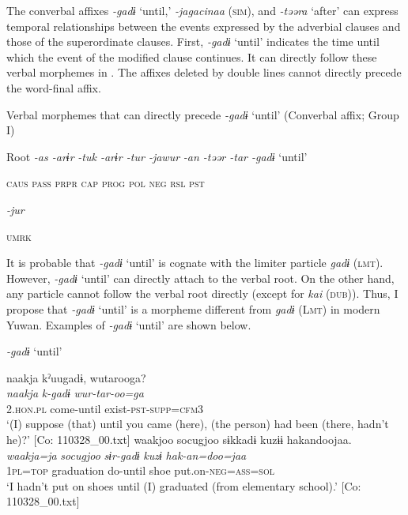 The converbal affixes \textit{-gadɨ} ‘until,’ \textit{-jagacinaa} (\textsc{sim}), and \textit{-təəra} ‘after’ can express temporal relationships between the events expressed by the adverbial clauses and those of the superordinate clauses. First, \textit{-gadɨ} ‘until’ indicates the time until which the event of the modified clause continues. It can directly follow these verbal morphemes in . The affixes deleted by double lines cannot directly precede the word-final affix.

\ea\label{ex:8-94}
  Verbal morphemes that can directly precede \textit{-gadɨ} ‘until’ (Converbal affix; Group I)

  Root  \textit{-as  -arɨr} %
\textit{-tuk  -arɨr  -tur  -jawur} %
\textit{-an  -təər  -tar  -gadɨ} ‘until’

    \textsc{caus}  \textsc{pass}  \textsc{prpr}  \textsc{cap}  \textsc{prog}  \textsc{pol}  \textsc{neg}  \textsc{rsl}  \textsc{pst}

          \textit{-jur}

          \textsc{umrk}
\z

It is probable that \textit{-gadɨ} ‘until’ is cognate with the limiter particle \textit{gadɨ} (\textsc{lmt}). However, \textit{-gadɨ} ‘until’ can directly attach to the verbal root. On the other hand, any particle cannot follow the verbal root directly (except for \textit{kai} (\textsc{dub})). Thus, I propose that \textit{-gadɨ} ‘until’ is a morpheme different from \textit{gadɨ} (L\textsc{mt}) in modern Yuwan. Examples of \textit{-gadɨ} ‘until’ are shown below.

\ea\label{ex:8-95}
  \textit{-gadɨ} ‘until’

\ea
{\TM}
\glll  naakja  kˀuugadɨ,  wutarooga?\\
\textit{naakja}  \textit{k-gadɨ}  \textit{wur-tar-oo=ga}\\
2.\textsc{hon}.\textsc{pl}  come-until  exist-\textsc{pst}-\textsc{supp}=\textsc{cfm3}\\
\glt ‘(I) suppose (that) until you came (here), (the person) had been (there, hadn’t he)?’ [Co: 110328\_00.txt]
\ex
{\TM}
\glll  waakjoo  {\textbar}socugjoo{\textbar}  sɨkkadɨ  kuzɨɨ  hakandoojaa.\\
\textit{waakja=ja}  \textit{socugjoo}  \textit{sɨr-gadɨ}  \textit{kuzɨ}  \textit{hak-an=doo=jaa}\\
1\textsc{pl}=\textsc{top}  graduation  do-until  shoe  put.on-\textsc{neg}=\textsc{ass}=\textsc{sol}\\
\glt ‘I hadn’t put on shoes until (I) graduated (from elementary school).’ [Co: 110328\_00.txt]
\z
\z

